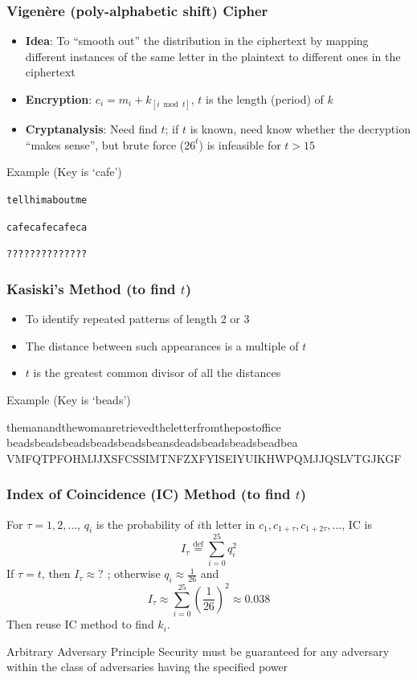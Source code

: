 \begin{frame}[fragile]\frametitle{Vigen\`{e}re (poly-alphabetic shift) Cipher}
\begin{itemize}
\item \textbf{Idea}: To ``smooth out'' the distribution in the ciphertext by mapping different instances of the same letter in the plaintext to different ones in the ciphertext
\item \textbf{Encryption}: $c_i=m_i+k_{[i\bmod t]}$, $t$ is the length (period) of $k$
\item \textbf{Cryptanalysis}: Need find $t$; if $t$ is known, need know whether the decryption ``makes sense'', but brute force ($26^t$) is infeasible for $t > 15$
\end{itemize}
\begin{exampleblock}{Example (Key is `cafe')}
\begin{description}[Ciphertext]
\item[Plaintext]  \verb|tellhimaboutme| \\
\item[Key]        \verb|cafecafecafeca| \\
\item[Ciphertext] \verb|??????????????| %
\end{description}
\end{exampleblock}
\end{frame}
\begin{frame}[fragile]\frametitle{Kasiski's Method (to find $t$)}
\begin{itemize}
\item To identify repeated patterns of length 2 or 3
\item The distance between such appearances is a multiple of $t$
\item $t$ is the greatest common divisor of all the distances
\end{itemize}
\begin{exampleblock}{Example (Key is `beads')}
\begin{semiverbatim}
themanandthewomanretrievedtheletterfromthepostoffice
beadsbeadsbeadsbeadsbeadsbeansdeadsbeadsbeadsbeadbea
VMFQTPFOH\alert{MJJ}XSFCSSIMTNFZXFYISEIYUIKHWPQ\alert{MJJ}QSLVTGJKGF
\end{semiverbatim}
\end{exampleblock}
\end{frame}
\begin{frame}\frametitle{Index of Coincidence (IC) Method (to find $t$)}
For $\tau = 1, 2, \dotsc$, $q_i$ is the probability of $i$th letter in $c_1, c_{1+\tau}, c_{1+2\tau}, \dotsc$, IC is
\[I_\tau \overset{\text{def}}{=}\sum_{i=0}^{25} q_i^2\]
\alert{If $\tau = t$, then $I_\tau \approx ?$} ; otherwise $q_i \approx \frac{1}{26}$ and
\[I_\tau \approx \sum_{i=0}^{25} \left(\frac{1}{26}\right)^2 \approx 0.038\]
Then reuse IC method to find $k_i$.
\begin{alertblock}{Arbitrary Adversary Principle}
Security must be guaranteed for any adversary within the class of adversaries having the specified power
\end{alertblock}
\end{frame}
